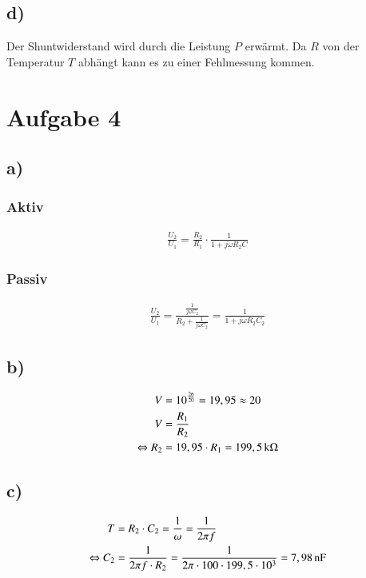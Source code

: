 \subsection*{d)}


Der Shuntwiderstand wird durch die Leistung $P$ erwärmt. Da $R$ von der Temperatur $T$ abhängt kann es zu einer Fehlmessung kommen.


\section{Aufgabe 4}

\subsection*{a)}

\subsubsection*{Aktiv}

\begin{align*}
\frac{U_2}{U_1} = \frac{R_2}{R_1} \cdot \frac{1}{1 + j \omega R_2 C}
\end{align*}


\subsubsection*{Passiv}

\begin{align*}
\frac{U_2}{U_1} = \frac{\frac{1}{j \omega C_2}}{R_2 + \frac{1}{j \omega C_2}} = \frac{1}{1 + j \omega R_2 C_2}
\end{align*}


\subsection*{b)}

\begin{align*}
V &= 10^{\frac{26}{20}} = 19,95 \approx 20 \\
V &= \frac{R_1}{R_2} \\
\Leftrightarrow R_2 &= 19,95 \cdot R_1 = \unit[199,5]{k \Omega}
\end{align*}


\subsection*{c)}

\begin{align*}
T &= R_2 \cdot C_2 = \frac{1}{\omega} = \frac{1}{2 \pi f} \\
\Leftrightarrow C_2 &= \frac{1}{2 \pi f \cdot R_2} = \frac{1}{2 \pi \cdot 100 \cdot 199,5 \cdot 10^3} = \unit[7,98]{nF}
\end{align*}


